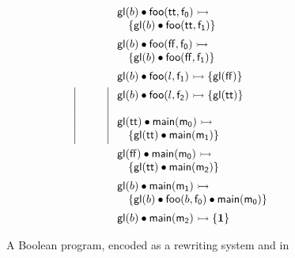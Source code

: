 \begin{figure}
\[\begin{array}{|rcl|}
  & &\\[15pt]
  & &\\
  & &\\
\end{array}
~
\begin{array}{l}
{\sf gl}(b) \mathbin{\bullet} {\sf foo}({\sf tt}, {\sf f_0}) \rightarrowtail ~\\
\quad \{ {\sf gl}(b) \mathbin{\bullet} {\sf foo}({\sf tt}, {\sf f_1}) \}\\[5pt]
{\sf gl}(b) \mathbin{\bullet} {\sf foo}({\sf ff}, {\sf f_0}) \rightarrowtail ~\\
\quad \{ {\sf gl}(b) \mathbin{\bullet} {\sf foo}({\sf ff}, {\sf f_1}) \}\\[5pt]
{\sf gl}(b) \mathbin{\bullet} {\sf foo}(l, {\sf f_1}) \rightarrowtail \{ {\sf gl}({\sf ff}) \}\\[5pt]
{\sf gl}(b) \mathbin{\bullet} {\sf foo}(l, {\sf f_2}) \rightarrowtail \{ {\sf gl}({\sf tt}) \}\\
\\
{\sf gl}({\sf tt}) \mathbin{\bullet} {\sf main}({\sf m_0}) \rightarrowtail ~\\
\quad \{ {\sf gl}({\sf tt}) \mathbin{\bullet} {\sf main}({\sf m_1}) \}\\[5pt]
{\sf gl}({\sf ff}) \mathbin{\bullet} {\sf main}({\sf m_0}) \rightarrowtail ~\\
\quad \{ {\sf gl}({\sf tt}) \mathbin{\bullet} {\sf main}({\sf m_2})\}\\[5pt]
{\sf gl}(b) \mathbin{\bullet} {\sf main}({\sf m_1}) \rightarrowtail ~\\
\quad \{ {\sf gl}(b) \mathbin{\bullet} {\sf foo}(b,{\sf f_0}) \mathbin{\bullet} {\sf main}({\sf m_0})\}\\[5pt]
{\sf gl}(b) \mathbin{\bullet} {\sf main}({\sf m_2}) \rightarrowtail \{ \mathbf{1} \}
\end{array}
\]
\caption{A Boolean program, encoded as a rewriting system and in \sls}
\label{fig:canonical}
\end{figure}